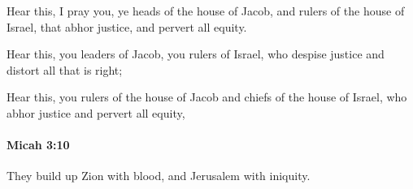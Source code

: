 			\begin{versebox}
					\item[BHS] 
					\item[LXX] 
					\item[ASV] Hear this, I pray you, ye heads of the house of Jacob, and rulers of the house of Israel, that abhor justice, and pervert all equity.
					\item[NIV] Hear this, you leaders of Jacob, you rulers of Israel, who despise justice and distort all that is right;
					\item[NRSV] Hear this, you rulers of the house of Jacob and chiefs of the house of Israel, who abhor justice and pervert all equity,
			\end{versebox}

		\paragraph{Micah 3:10} %
			\label{MICAH-3-10}

			They build up Zion with blood, and Jerusalem with iniquity.

